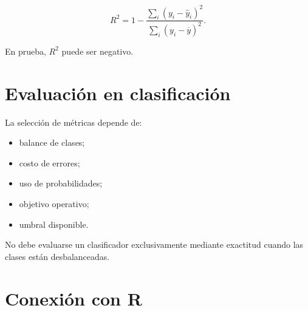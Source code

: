 \documentclass[
  spanish,
  11pt,
  letterpaper,
  DIV=11,
  numbers=noendperiod]{scrreprt}
\providecommand{\tightlist}{%
  \setlength{\itemsep}{0pt}\setlength{\parskip}{0pt}}
\theoremstyle{definition}
\theoremstyle{plain}
\theoremstyle{definition}
\theoremstyle{remark}
\begin{document}
\[
R^2
=
1-
\frac{
\sum_i(y_i-\widehat{y}_i)^2
}{
\sum_i(y_i-\overline{y})^2
}.
\]

En prueba, \(R^2\) puede ser negativo.

\section{Evaluación en
clasificación}\label{evaluaciuxf3n-en-clasificaciuxf3n}

La selección de métricas depende de:

\begin{itemize}
\tightlist
\item
  balance de clases;
\item
  costo de errores;
\item
  uso de probabilidades;
\item
  objetivo operativo;
\item
  umbral disponible.
\end{itemize}

No debe evaluarse un clasificador exclusivamente mediante exactitud
cuando las clases están desbalanceadas.

\section{Conexión con R}\label{conexiuxf3n-con-r-6}
\end{document}
